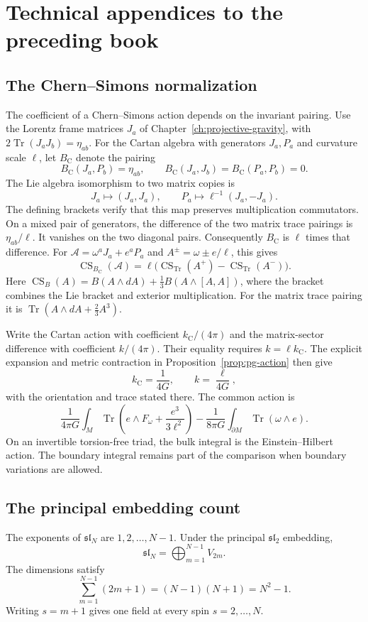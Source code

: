 \part{Technical appendices to the preceding book}
\chapter{The Chern--Simons normalization}
The coefficient of a Chern--Simons action depends on the invariant pairing.
Use the Lorentz frame matrices $J_a$ of Chapter~\ref{ch:projective-gravity}, with
$2\operatorname{Tr}(J_aJ_b)=\eta_{ab}$.
For the Cartan algebra with generators $J_a,P_a$ and curvature scale $\ell$,
let $B_{\mathrm C}$ denote the pairing
\[
 B_{\mathrm C}(J_a,P_b)=\eta_{ab},\qquad
 B_{\mathrm C}(J_a,J_b)=B_{\mathrm C}(P_a,P_b)=0.
\]
The Lie algebra isomorphism to two matrix copies is
\[
 J_a\longmapsto(J_a,J_a),\qquad
 P_a\longmapsto\ell^{-1}(J_a,-J_a).
\]
The defining brackets verify that this map preserves multiplication commutators.
On a mixed pair of generators, the difference of the two matrix trace pairings
is $\eta_{ab}/\ell$. It vanishes on the two diagonal pairs.
Consequently $B_{\mathrm C}$ is $\ell$ times that difference.
For $\mathcal A=\omega^aJ_a+e^aP_a$ and $A^\pm=\omega\pm e/\ell$, this gives
\[
 \operatorname{CS}_{B_{\mathrm C}}(\mathcal A)
 =\ell\bigl(\operatorname{CS}_{\operatorname{Tr}}(A^+)
             -\operatorname{CS}_{\operatorname{Tr}}(A^-)\bigr).
\]
Here $\operatorname{CS}_B(A)=B(A\wedge dA)+\tfrac13B(A\wedge[A,A])$,
where the bracket combines the Lie bracket and exterior multiplication.
For the matrix trace pairing it is $\operatorname{Tr}(A\wedge dA+\tfrac23A^3)$.

Write the Cartan action with coefficient $k_{\mathrm C}/(4\pi)$ and the
matrix-sector difference with coefficient $k/(4\pi)$.
Their equality requires $k=\ell k_{\mathrm C}$.
The explicit expansion and metric contraction in
Proposition~\ref{prop:pg-action} then give
\[
 k_{\mathrm C}=\frac1{4G},\qquad k=\frac{\ell}{4G},
\]
with the orientation and trace stated there.
The common action is
\[
 \frac1{4\pi G}\int_M\operatorname{Tr}
 \left(e\wedge F_\omega+\frac{e^3}{3\ell^2}\right)
 -\frac1{8\pi G}\int_{\partial M}\operatorname{Tr}(\omega\wedge e).
\]
On an invertible torsion-free triad, the bulk integral is the Einstein--Hilbert action.
The boundary integral remains part of the comparison when boundary variations are allowed.

\chapter{The principal embedding count}
The exponents of $\mathfrak{sl}_N$ are $1,2,\ldots,N-1$.  Under the principal $\mathfrak{sl}_2$ embedding,
\[
 \mathfrak{sl}_N=\bigoplus_{m=1}^{N-1}V_{2m}.
\]
The dimensions satisfy
\[
 \sum_{m=1}^{N-1}(2m+1)
 =(N-1)(N+1)=N^2-1.
\]
Writing $s=m+1$ gives one field at every spin $s=2,\ldots,N$.

